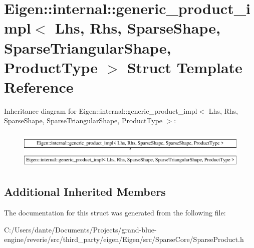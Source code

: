 \hypertarget{struct_eigen_1_1internal_1_1generic__product__impl_3_01_lhs_00_01_rhs_00_01_sparse_shape_00_01_s05ccb218a557b35cabc12ad35cb16218}{}\section{Eigen\+::internal\+::generic\+\_\+product\+\_\+impl$<$ Lhs, Rhs, Sparse\+Shape, Sparse\+Triangular\+Shape, Product\+Type $>$ Struct Template Reference}
\label{struct_eigen_1_1internal_1_1generic__product__impl_3_01_lhs_00_01_rhs_00_01_sparse_shape_00_01_s05ccb218a557b35cabc12ad35cb16218}
Inheritance diagram for Eigen\+::internal\+::generic\+\_\+product\+\_\+impl$<$ Lhs, Rhs, Sparse\+Shape, Sparse\+Triangular\+Shape, Product\+Type $>$\+:\begin{figure}[H]
\begin{center}
\leavevmode
\includegraphics[height=1.833061cm]{struct_eigen_1_1internal_1_1generic__product__impl_3_01_lhs_00_01_rhs_00_01_sparse_shape_00_01_s05ccb218a557b35cabc12ad35cb16218}
\end{center}
\end{figure}
\subsection*{Additional Inherited Members}


The documentation for this struct was generated from the following file\+:\begin{DoxyCompactItemize}
\item 
C\+:/\+Users/dante/\+Documents/\+Projects/grand-\/blue-\/engine/reverie/src/third\+\_\+party/eigen/\+Eigen/src/\+Sparse\+Core/Sparse\+Product.\+h\end{DoxyCompactItemize}
